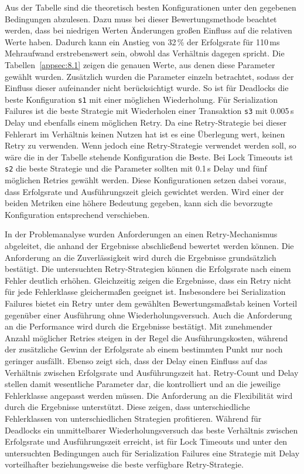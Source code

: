 
Aus der Tabelle sind die theoretisch besten Konfigurationen unter den gegebenen Bedingungen abzulesen.
Dazu muss bei dieser Bewertungsmethode beachtet werden, dass bei niedrigen Werten Änderungen großen Einfluss
auf die relativen Werte haben.
Dadurch kann ein Anstieg von 32\,\% der Erfolgsrate für 110\,ms Mehraufwand erstrebenswert sein, obwohl das Verhältnis
dagegen spricht.
Die Tabellen~\ref{appsec:8.1} zeigen die genauen Werte, aus denen diese Parameter gewählt wurden.
Zusätzlich wurden die Parameter einzeln betrachtet, sodass der Einfluss dieser aufeinander nicht berücksichtigt wurde.
So ist für Deadlocks die beste Konfiguration \texttt{s1} mit einer möglichen Wiederholung.
Für Serialization Failures ist die beste Strategie mit Wiederholen einer Transaktion \texttt{s3} mit 0.005\,s Delay
und ebenfalls einem möglichen Retry.
Da eine Retry-Strategie bei dieser Fehlerart im Verhältnis keinen Nutzen hat ist es eine Überlegung wert, keinen
Retry zu verwenden.
Wenn jedoch eine Retry-Strategie verwendet werden soll, so wäre die in der Tabelle stehende Konfiguration die Beste.
Bei Lock Timeouts ist \texttt{s2} die beste Strategie und die Parameter sollten mit 0.1\,s Delay und fünf möglichen
Retries gewählt werden.
Diese Konfigurationen setzen dabei voraus, dass Erfolgsrate und Ausführungszeit gleich gewichtet werden.
Wird einer der beiden Metriken eine höhere Bedeutung gegeben, kann sich die bevorzugte Konfiguration
entsprechend verschieben.

In der Problemanalyse wurden Anforderungen an einen Retry-Mechanismus abgeleitet, die anhand der Ergebnisse
abschließend bewertet werden können.
Die Anforderung an die Zuverlässigkeit wird durch die Ergebnisse grundsätzlich bestätigt.
Die untersuchten Retry-Strategien können die Erfolgsrate nach einem Fehler deutlich erhöhen.
Gleichzeitig zeigen die Ergebnisse, dass ein Retry nicht für jede Fehlerklasse gleichermaßen geeignet ist.
Insbesondere bei Serialization Failures bietet ein Retry unter dem gewählten Bewertungsmaßstab keinen Vorteil
gegenüber einer Ausführung ohne Wiederholungsversuch.
Auch die Anforderung an die Performance wird durch die Ergebnisse bestätigt.
Mit zunehmender Anzahl möglicher Retries steigen in der Regel die Ausführungskosten, während der zusätzliche Gewinn
der Erfolgsrate ab einem bestimmten Punkt nur noch geringer ausfällt.
Ebenso zeigt sich, dass der Delay einen Einfluss auf das Verhältnis zwischen Erfolgsrate und Ausführungszeit hat.
Retry-Count und Delay stellen damit wesentliche Parameter dar, die kontrolliert und an die jeweilige Fehlerklasse
angepasst werden müssen.
Die Anforderung an die Flexibilität wird durch die Ergebnisse unterstützt.
Diese zeigen, dass unterschiedliche Fehlerklassen von unterschiedlichen Strategien profitieren.
Während für Deadlocks ein unmittelbarer Wiederholungsversuch das beste Verhältnis zwischen Erfolgsrate und
Ausführungszeit erreicht, ist für Lock Timeouts und unter den untersuchten Bedingungen auch für Serialization
Failures eine Strategie mit Delay vorteilhafter beziehungsweise die beste verfügbare Retry-Strategie.

